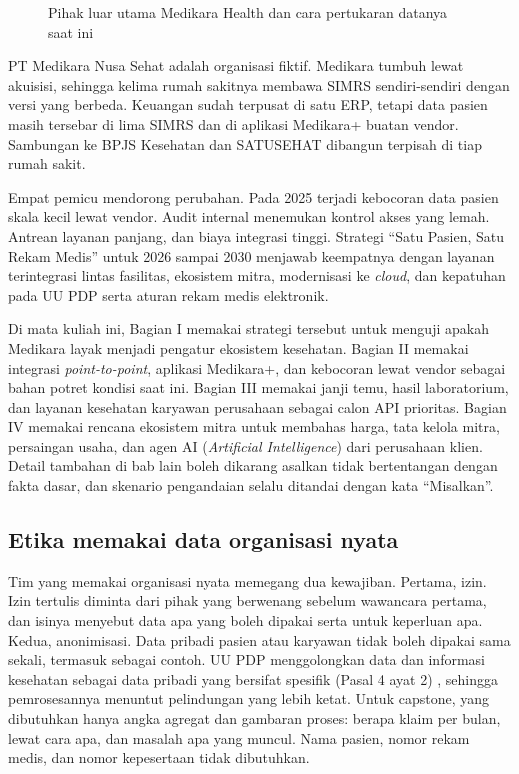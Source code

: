 \begin{figure}[!htb]
  \centering
  
  \caption{Pihak luar utama Medikara Health dan cara pertukaran datanya saat ini}
  \label{fig:ch01-medikara-pihak-luar}
\end{figure}

\begin{kasus}[title={Kasus Medikara Health: Ringkasan untuk Seluruh Semester}]
PT Medikara Nusa Sehat adalah organisasi fiktif. Medikara tumbuh lewat akuisisi,
sehingga kelima rumah sakitnya membawa SIMRS sendiri-sendiri dengan versi yang
berbeda. Keuangan sudah terpusat di satu ERP, tetapi data pasien masih tersebar
di lima SIMRS dan di aplikasi Medikara+ buatan vendor. Sambungan ke BPJS
Kesehatan dan SATUSEHAT dibangun terpisah di tiap rumah sakit.

Empat pemicu mendorong perubahan. Pada 2025 terjadi kebocoran data pasien skala
kecil lewat vendor. Audit internal menemukan kontrol akses yang lemah. Antrean
layanan panjang, dan biaya integrasi tinggi. Strategi ``Satu Pasien, Satu Rekam
Medis'' untuk 2026 sampai 2030 menjawab keempatnya dengan layanan terintegrasi
lintas fasilitas, ekosistem mitra, modernisasi ke \textit{cloud}, dan kepatuhan
pada UU PDP serta aturan rekam medis elektronik.

Di mata kuliah ini, Bagian I memakai strategi tersebut untuk menguji apakah
Medikara layak menjadi pengatur ekosistem kesehatan. Bagian II memakai integrasi
\textit{point-to-point}, aplikasi Medikara+, dan kebocoran lewat vendor sebagai
bahan potret kondisi saat ini. Bagian III memakai janji temu, hasil laboratorium,
dan layanan kesehatan karyawan perusahaan sebagai calon API prioritas. Bagian IV
memakai rencana ekosistem mitra untuk membahas harga, tata kelola mitra,
persaingan usaha, dan agen AI (\textit{Artificial Intelligence}) dari perusahaan
klien. Detail tambahan di bab lain boleh dikarang asalkan tidak bertentangan
dengan fakta dasar, dan skenario pengandaian selalu ditandai dengan kata
``Misalkan''.
\end{kasus}

\subsection*{Etika memakai data organisasi nyata}

Tim yang memakai organisasi nyata memegang dua kewajiban. Pertama, izin. Izin
tertulis diminta dari pihak yang berwenang sebelum wawancara pertama, dan isinya
menyebut data apa yang boleh dipakai serta untuk keperluan apa. Kedua,
anonimisasi. Data pribadi pasien atau karyawan tidak boleh dipakai sama sekali,
termasuk sebagai contoh. UU PDP menggolongkan data dan informasi kesehatan
sebagai data pribadi yang bersifat spesifik (Pasal 4 ayat 2)
\cite{uu27-2022-pdp}, sehingga pemrosesannya menuntut pelindungan yang lebih
ketat. Untuk capstone, yang dibutuhkan hanya angka agregat dan gambaran proses:
berapa klaim per bulan, lewat cara apa, dan masalah apa yang muncul. Nama pasien,
nomor rekam medis, dan nomor kepesertaan tidak dibutuhkan.

